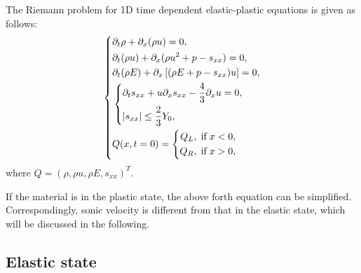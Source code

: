 \documentclass[review]{elsarticle}
\numberwithin{equation}{section}
\numberwithin{table}{section}
\begin{document}
The Riemann problem for 1D time dependent elastic-plastic equations is given as follows:
 \begin{equation}\label{eq:1d}
   \left\{ \begin{align}
       & \partial _t \rho +\partial_x(\rho u)=0,\\
       & \partial _t (\rho u)+\partial_x(\rho u^2 + p -s_{xx})=0,\\
       &\partial _t (\rho E)+\partial_x\left[(\rho E + p -s_{xx})u\right]=0,\\
	   & \left\{\begin{aligned}
       &\partial _t s_{xx}+u\partial_xs_{xx}-\frac{4}{3}\partial_x u=0,\\
& |s_{xx}|\leq \frac{2}{3}Y_{0}, \\
\end{aligned}\right.\\
       &Q(x,t = 0) = \left\{\begin{aligned}
           Q_L, \hspace{0.1cm} \text{if} \hspace{0.1cm} x<0, \\
           Q_R, \hspace{0.1cm} \text{if} \hspace{0.1cm} x > 0, \\
       \end{aligned}\right.
     \end{align}
  \right.
\end{equation}
where $Q = (\rho, \rho u, \rho E, s_{xx})^T$.



If the material is in the plastic state, the above forth equation can be simplified. Correspondingly, sonic velocity is different from that in the elastic state, 
which will be discussed in the following.

\subsection{Elastic state}
\end{document}
